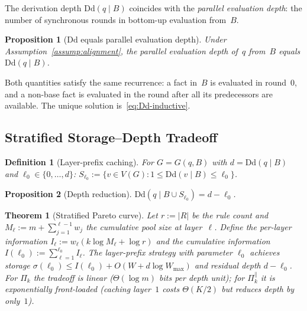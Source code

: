 \documentclass[journal]{IEEEtran}
\makeatletter
\newcommand{\Dd}{\text{Dd}}
\newtheorem{theorem}{Theorem}[section]
\newtheorem{proposition}{Proposition}[section]
\newtheorem{definition}{Definition}[section]
\numberwithin{equation}{section}
\renewenvironment{proof}[1][\proofname]{\par
  \pushQED{\qed}%
  \normalfont \topsep6\p@\@plus6\p@\relax
  \trivlist
  \item[\hskip\labelsep
        \itshape
    #1\@addpunct{.}]\ignorespaces
}{%
  \popQED\endtrivlist\@endpefalse
}
\makeatother
\begin{document}
The derivation depth $\Dd(q\mid B)$ coincides with the
\emph{parallel evaluation depth}: the number of synchronous
rounds in bottom-up evaluation from~$B$.

\begin{proposition}[$\Dd$ equals parallel evaluation depth]
\label{prop:dd-parallel}
Under Assumption~\ref{assump:alignment}, the parallel
evaluation depth of~$q$ from~$B$ equals $\Dd(q\mid B)$.
\end{proposition}

\begin{proof}
Both quantities satisfy the same recurrence: a fact in~$B$ is
evaluated in round~$0$, and a non-base fact is evaluated in the
round after all its predecessors are available.
The unique solution is~\eqref{eq:Dd-inductive}.
\end{proof}

\subsection{Stratified Storage--Depth Tradeoff}
\label{subsec:stratified-tradeoff}

\begin{definition}[Layer-prefix caching]
\label{def:layer-prefix-cache}
For $G=G(q,B)$ with $d=\Dd(q\mid B)$ and
$\ell_0\in\{0,\ldots,d\}$:
$S_{\ell_0}:=\{v\in V(G):1\le\Dd(v\mid B)\le\ell_0\}$.
\end{definition}

\begin{proposition}[Depth reduction]
\label{prop:layer-prefix-depth}
$\Dd(q\mid B\cup S_{\ell_0})=d-\ell_0$.
\end{proposition}

\begin{theorem}[Stratified Pareto curve]
\label{thm:stratified-tradeoff}
Let $r:=|R|$ be the rule count and
$M_\ell:=m+\sum_{j=1}^{\ell-1}w_j$ the cumulative pool
size at layer~$\ell$.
Define the per-layer information
$I_\ell:=w_\ell(k\log M_\ell+\log r)$ and the cumulative
information $I(\ell_0):=\sum_{\ell=1}^{\ell_0}I_\ell$.
The layer-prefix strategy with parameter $\ell_0$ achieves
storage
$\sigma(\ell_0)\le I(\ell_0)+O(W+d\log W_{\max})$
and residual depth $d{-}\ell_0$.
For $\Pi_k$ the tradeoff is linear
\textup{(}$\Theta(\log m)$ bits per depth unit\textup{)};
for $\Pi_k^{\parallel}$ it is exponentially front-loaded
\textup{(}caching layer~$1$ costs $\Theta(K/2)$ but
reduces depth by only~$1$\textup{)}.
\end{theorem}
\end{document}
